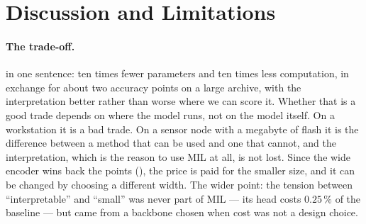 %

\section{Discussion and Limitations}
\label{sec:disc}

\paragraph{The trade-off.}
 in one sentence: ten times fewer parameters and ten times less computation, in
exchange for about two accuracy points on a large archive, with the interpretation better rather than
worse where we can score it. Whether that is a good trade depends on where the model runs, not on the
model itself. On a workstation it is a bad trade. On a sensor node with a megabyte of flash it is the
difference between a method that can be used and one that cannot, and the interpretation, which is
the reason to use MIL at all, is not lost. Since the wide encoder wins back the \ucr{} points
(), the price is paid for the smaller size, and it can be changed by choosing a
different width. The wider point: the tension between ``interpretable'' and ``small'' was never part
of MIL --- its head costs $0.25\,\%$ of the baseline --- but came from a backbone chosen when cost was
not a design choice.

